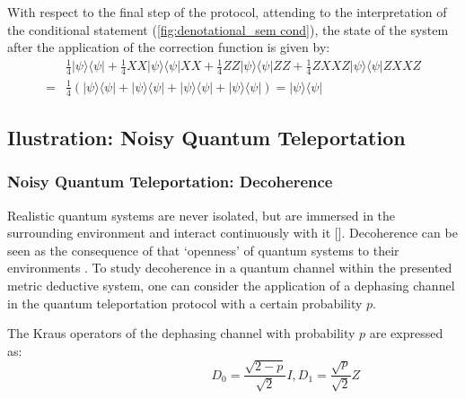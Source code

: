 With respect to the final step of the protocol, attending to the interpretation of the conditional statement (\autoref{fig:denotational_sem cond}), the state of the system after the application of the correction function is given by:
\begin{equation} \label{eq:teleport_correction}
  \begin{split}
  &\frac{1}{4}|\psi\rangle \langle \psi| + \frac{1}{4} X X|\psi\rangle \langle \psi|XX +\frac{1}{4} ZZ|\psi\rangle \langle \psi|ZZ + \frac{1}{4} ZXXZ|\psi\rangle \langle \psi|ZXXZ  \\
  =& \frac{1}{4} \left( |\psi\rangle \langle \psi| + |\psi\rangle \langle \psi| + |\psi\rangle \langle \psi|+ |\psi\rangle \langle \psi| \right) =  |\psi\rangle \langle \psi|
  \end{split}
\end{equation}

\subsection{Ilustration: Noisy Quantum Teleportation}


\subsubsection{Noisy Quantum Teleportation: Decoherence}


Realistic quantum systems are never isolated, but are immersed
in the surrounding environment and interact continuously with it [\cite{schlosshauer2005decoherence}]. Decoherence can be seen as the consequence of that  `openness' of quantum systems to their  environments .  To study decoherence in a quantum channel within the presented metric deductive system, one can consider the application of a dephasing channel in the quantum teleportation protocol with a certain probability $p$.

The Kraus operators of the dephasing channel with probability $p$ are expressed as:
\begin{equation}
    \hspace{100pt} D_{0}= \frac{\sqrt{2-p}}{\sqrt{2}} I,  D_{1}= \frac{\sqrt{p}}{\sqrt{2}} Z
\end{equation}

